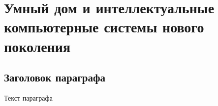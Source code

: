 \chapter{Умный дом и интеллектуальные компьютерные системы нового поколения}
\label{chapter_smart_home}


\section{Заголовок параграфа}
Текст параграфа

%